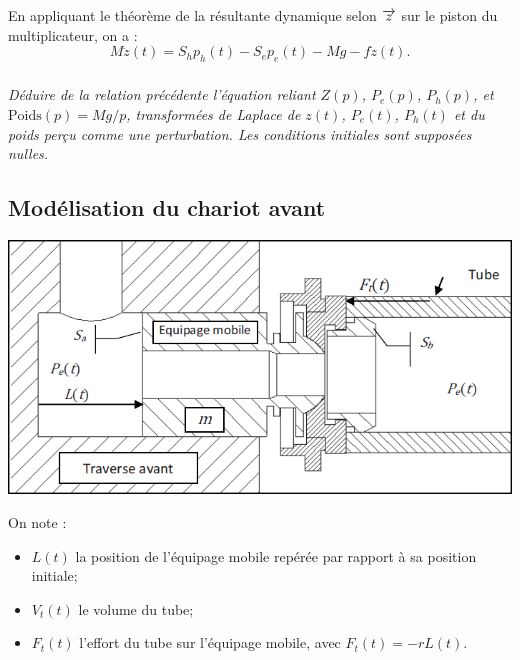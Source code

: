 \documentclass[10pt,fleqn]{article} %
\begin{document}
\begin{multicols}{2}
En appliquant le théorème de la résultante dynamique selon $\overrightarrow{z}$ sur le piston du multiplicateur, on a : 
$$
M\ddot{z}(t)=S_hp_h(t)-S_ep_e(t)-Mg-f\dot{z}(t).
$$
\subparagraph{}
\textit{Déduire de la relation précédente l’équation reliant $Z(p)$, $P_e(p)$, $P_h(p)$, et $\text{Poids}(p)=Mg/p$, transformées de Laplace de $z(t)$, $P_e(t)$, $P_h(t)$ et du poids perçu comme une perturbation. Les conditions initiales sont supposées nulles.}

\subsection*{Modélisation du chariot avant}



\begin{center}
\includegraphics[width=.95\linewidth]{images_02/fig_03}
\end{center}


On note :
\begin{itemize}
	\item $L(t)$ la position de l’équipage mobile repérée par rapport à sa position initiale;
	\item $V_t(t)$ le volume du tube;
	\item $F_t(t)$ l’effort du tube sur l’équipage mobile, avec $F_t(t) = - rL(t)$.
\end{itemize}


\end{multicols}
\end{document}
